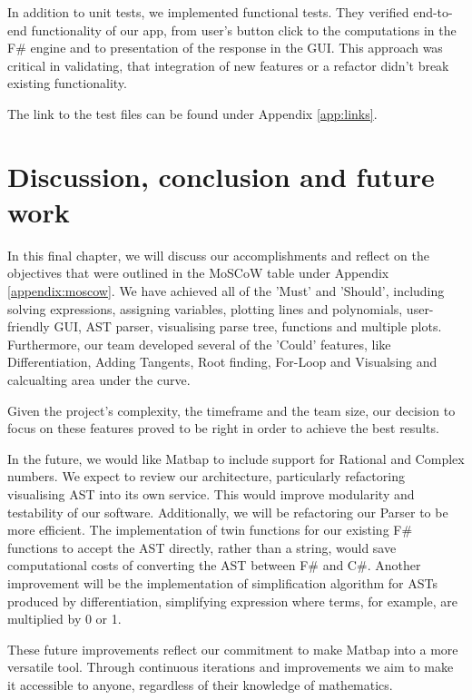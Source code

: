 \documentclass[a4paper, oneside, 11pt]{report}
\begin{document}
In addition to unit tests, we implemented functional tests. They verified end-to-end  functionality of our app, from user's button click to the computations in the F\# engine and to presentation of the response in the GUI. This approach was critical in validating, that integration of new features or a refactor didn't break existing functionality.

The link to the test files can be found under Appendix \ref{app:links}.

\chapter{Discussion, conclusion and future work}

In this final chapter, we will discuss our accomplishments and reflect on the objectives that were outlined in the MoSCoW table under Appendix \ref{appendix:moscow}. We have achieved all of the 'Must' and 'Should', including solving expressions, assigning variables, plotting lines and polynomials, user-friendly GUI, AST parser, visualising parse tree, functions and multiple plots. Furthermore, our team developed several of the 'Could' features, like Differentiation, Adding Tangents, Root finding, For-Loop and Visualsing and calcualting area under the curve. 

Given the project's complexity, the timeframe and the team size, our decision to focus on these features proved to be right in order to achieve the best results.

In the future, we would like Matbap to include support for Rational and Complex numbers. We expect to review our architecture, particularly refactoring visualising AST into its own service. This would improve modularity and testability of our software. Additionally, we will be refactoring our Parser to be more efficient. The implementation of twin functions for our existing F\# functions to accept the AST directly, rather than a string, would save computational costs of converting the AST between F\# and C\#. Another improvement will be the implementation of simplification algorithm for ASTs produced by differentiation, simplifying expression where terms, for example, are multiplied by 0 or 1.

These future improvements reflect our commitment to make Matbap into a more versatile tool. Through continuous iterations and improvements we aim to make it accessible to anyone, regardless of their knowledge of mathematics.


\raggedright

\end{document}
